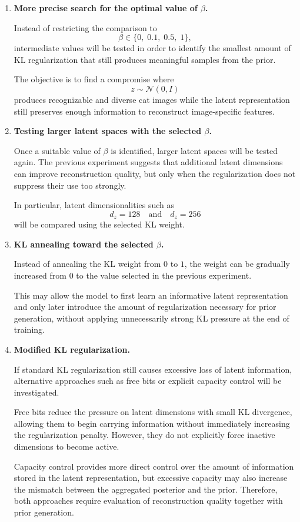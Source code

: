 \documentclass[a4paper,11pt]{article}
\begin{document}
\begin{enumerate}

    \item \textbf{More precise search for the optimal value of $\beta$.}

    Instead of restricting the comparison to
    \[
    \beta \in \{0,\;0.1,\;0.5,\;1\},
    \]
    intermediate values will be tested in order to identify the smallest amount of KL regularization that still produces meaningful samples from the prior.

    The objective is to find a compromise where
    \[
    z \sim \mathcal{N}(0,I)
    \]
    produces recognizable and diverse cat images while the latent representation still preserves enough information to reconstruct image-specific features.

    \item \textbf{Testing larger latent spaces with the selected $\beta$.}

    Once a suitable value of $\beta$ is identified, larger latent spaces will be tested again. The previous experiment suggests that additional latent dimensions can improve reconstruction quality, but only when the regularization does not suppress their use too strongly.

    In particular, latent dimensionalities such as
    \[
    d_z = 128
    \quad\text{and}\quad
    d_z = 256
    \]
    will be compared using the selected KL weight.

    \item \textbf{KL annealing toward the selected $\beta$.}

    Instead of annealing the KL weight from $0$ to $1$, the weight can be gradually increased from $0$ to the value selected in the previous experiment.

    This may allow the model to first learn an informative latent representation and only later introduce the amount of regularization necessary for prior generation, without applying unnecessarily strong KL pressure at the end of training.

    \item \textbf{Modified KL regularization.}

    If standard KL regularization still causes excessive loss of latent information, alternative approaches such as free bits or explicit capacity control will be investigated.

    Free bits reduce the pressure on latent dimensions with small KL divergence, allowing them to begin carrying information without immediately increasing the regularization penalty. However, they do not explicitly force inactive dimensions to become active.

    Capacity control provides more direct control over the amount of information stored in the latent representation, but excessive capacity may also increase the mismatch between the aggregated posterior and the prior. Therefore, both approaches require evaluation of reconstruction quality together with prior generation.

\end{enumerate}
\end{document}
